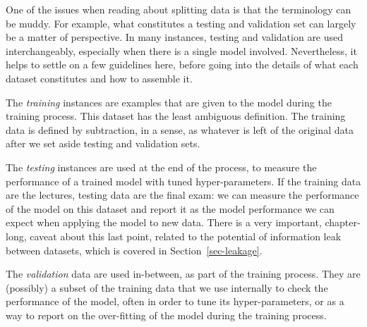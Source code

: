 \documentclass[
  letterpaper,
]{scrbook}
\begin{document}
One of the issues when reading about splitting data is that the
terminology can be muddy. For example, what constitutes a testing and
validation set can largely be a matter of perspective. In many
instances, testing and validation are used interchangeably, especially
when there is a single model involved. Nevertheless, it helps to settle
on a few guidelines here, before going into the details of what each
dataset constitutes and how to assemble it.

The \emph{training} instances are examples that are given to the model
during the training process. This dataset has the least ambiguous
definition. The training data is defined by subtraction, in a sense, as
whatever is left of the original data after we set aside testing and
validation sets.

The \emph{testing} instances are used at the end of the process, to
measure the performance of a trained model with tuned hyper-parameters.
If the training data are the lectures, testing data are the final exam:
we can measure the performance of the model on this dataset and report
it as the model performance we can expect when applying the model to new
data. There is a very important, chapter-long, caveat about this last
point, related to the potential of information leak between datasets,
which is covered in Section~\ref{sec-leakage}.

The \emph{validation} data are used in-between, as part of the training
process. They are (possibly) a subset of the training data that we use
internally to check the performance of the model, often in order to tune
its hyper-parameters, or as a way to report on the over-fitting of the
model during the training process.

\begin{figure}[bt]



\end{figure}%
\end{document}
